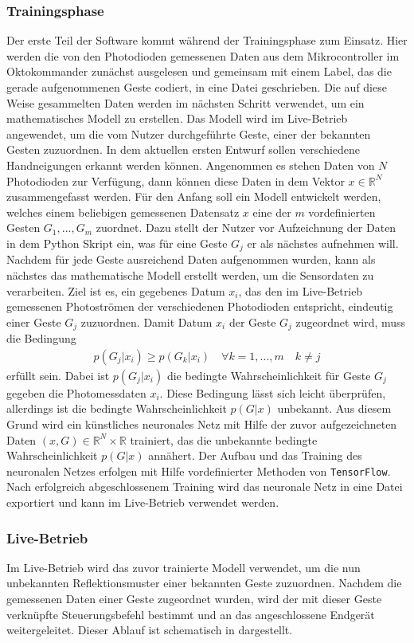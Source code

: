 \subsubsection*{Trainingsphase}
Der erste Teil der Software kommt während der Trainingsphase zum Einsatz. Hier werden die von den Photodioden gemessenen Daten aus dem Mikrocontroller im Oktokommander zunächst ausgelesen und gemeinsam mit einem Label, das die gerade aufgenommenen Geste codiert, in eine Datei geschrieben. Die auf diese Weise gesammelten Daten werden im nächsten Schritt verwendet, um ein mathematisches Modell zu erstellen. Das Modell wird im Live-Betrieb angewendet, um die vom Nutzer durchgeführte Geste, einer der bekannten Gesten zuzuordnen. In dem aktuellen ersten Entwurf sollen verschiedene Handneigungen erkannt werden können. Angenommen es stehen Daten von $N$ Photodioden zur Verfügung, dann können diese Daten in dem Vektor $x\in \mathbb{R}^N$ zusammengefasst werden. Für den Anfang soll ein Modell entwickelt werden, welches einem beliebigen gemessenen Datensatz $x$ eine der $m$ vordefinierten Gesten $G_1 , ... , G_m$ zuordnet. Dazu stellt der Nutzer vor Aufzeichnung der Daten in dem Python Skript ein, was für eine Geste $G_j$ er als nächstes aufnehmen will. Nachdem für jede Geste ausreichend Daten aufgenommen wurden, kann als nächstes das mathematische Modell erstellt werden, um die Sensordaten zu verarbeiten. Ziel ist es, ein gegebenes Datum $x_i$, das den im Live-Betrieb gemessenen Photoströmen der verschiedenen Photodioden entspricht, eindeutig einer Geste $G_j$ zuzuordnen. Damit Datum $x_i$ der Geste $G_j$ zugeordnet wird, muss die Bedingung 
\begin{align*}
	p(G_j | x_i) \geq p(G_k | x_i) \quad \forall k = 1,...,m \quad k \neq j
\end{align*}
erfüllt sein. Dabei ist $p(G_j | x_i)$ die bedingte Wahrscheinlichkeit für Geste $G_j$ gegeben die Photomessdaten $x_i$. Diese Bedingung lässt sich leicht überprüfen, allerdings ist die bedingte Wahrscheinlichkeit $p(G | x)$ unbekannt. Aus diesem Grund wird ein künstliches neuronales Netz mit Hilfe der zuvor aufgezeichneten Daten $(x,G) \in \mathbb{R}^N \times \mathbb{R}$ trainiert, das die unbekannte bedingte Wahrscheinlichkeit $p(G | x)$ annähert. Der Aufbau und das Training des neuronalen Netzes erfolgen mit Hilfe vordefinierter Methoden von \texttt{TensorFlow}\texttrademark. Nach erfolgreich abgeschlossenem Training wird das neuronale Netz in eine Datei exportiert und kann im Live-Betrieb verwendet werden.

\subsubsection*{Live-Betrieb}
Im Live-Betrieb wird das zuvor trainierte Modell verwendet, um die nun unbekannten Reflektionsmuster einer bekannten Geste zuzuordnen. Nachdem die gemessenen Daten einer Geste zugeordnet wurden, wird der mit dieser Geste verknüpfte Steuerungsbefehl bestimmt und an das angeschlossene Endgerät weitergeleitet. Dieser Ablauf ist schematisch in  dargestellt.

